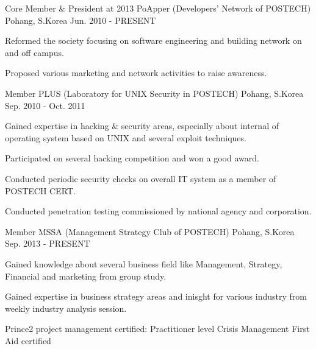 \begin{cventries}
  \cventry
    {Core Member \& President at 2013}
    {PoApper (Developers' Network of POSTECH)}
    {Pohang, S.Korea}
    {Jun. 2010 - PRESENT}
    {
      \begin{cvitems}
        \item {Reformed the society focusing on software engineering and building network on and off campus.}
        \item {Proposed various marketing and network activities to raise awareness.}
      \end{cvitems}
    }
  \cventry
    {Member}
    {PLUS (Laboratory for UNIX Security in POSTECH)}
    {Pohang, S.Korea}
    {Sep. 2010 - Oct. 2011}
    {
      \begin{cvitems}
        \item {Gained expertise in hacking \& security areas, especially about internal of operating system based on UNIX and several exploit techniques.}
        \item {Participated on several hacking competition and won a good award.}
        \item {Conducted periodic security checks on overall IT system as a member of POSTECH CERT.}
        \item {Conducted penetration testing commissioned by national agency and corporation.}
      \end{cvitems}
    }
  \cventry
    {Member}
    {MSSA (Management Strategy Club of POSTECH)}
    {Pohang, S.Korea}
    {Sep. 2013 - PRESENT}
    {
      \begin{cvitems}
        \item {Gained knowledge about several business field like Management, Strategy, Financial and marketing from group study.}
        \item {Gained expertise in business strategy areas and inisght for various industry from weekly industry analysis session.}
      \end{cvitems}
    }
\end{cventries}
Prince2 project management certified: Practitioner level
Crisis Management
First Aid certified 
